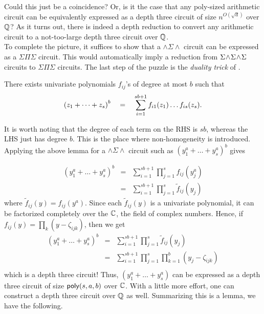 Could this just be a coincidence? Or, is it the case that any poly-sized arithmetic circuit can be equivalently expressed as a depth three circuit of size $n^{O(\sqrt{d})}$ over $\mathbb{Q}$? As it turns out, there is indeed a depth reduction to convert any arithmetic circuit to a not-too-large depth three circuit over $\mathbb{Q}$. \\

To complete the picture, it suffices to show that a $\wedge\Sigma\wedge$ circuit can be expressed as a $\Sigma\Pi\Sigma$ circuit. This would automatically imply a reduction from $\Sigma\!\wedge\!\Sigma\!\wedge\!\Sigma$ circuits to $\Sigma\Pi\Sigma$ circuits. The last step of the puzzle is the \emph{duality trick} of \cite{sax08}. 

\begin{lemma}\label{lem:duality} There exists univariate polynomials $f_{ij}$'s of degree at most $b$ such that
$$
\left(z_1 + \dots + z_s\right)^b \quad = \quad \sum_{i=1}^{sb+1} f_{i1}(z_1)\dots f_{is}(z_s).
$$
\end{lemma}

It is worth noting that the degree of each term on the RHS is $sb$, whereas the LHS just has degree $b$. This is the place where non-homogeneity is introduced. Applying the above lemma for a $\wedge\Sigma\wedge$ circuit such as $(y_1^a + \dots + y_s^a)^b$ gives

\begin{eqnarray*}
(y_1^a + \dots + y_s^a)^b & = & \sum_{i=1}^{sb+1} \prod_{j=1}^s f_{ij}(y_j^a)\\
 & = & \sum_{i=1}^{sb+1} \prod_{j=1}^s \tilde{f}_{ij}(y_j)
\end{eqnarray*}
where $\tilde{f}_{ij}(y) = f_{ij}(y^a)$. Since each $\tilde{f}_{ij}(y)$ is a univariate polynomial, it can be factorized completely over the $\mathbb{C}$, the field of complex numbers. Hence, if $f_{ij}(y) = \prod_k (y - \zeta_{ijk})$, then we get
\begin{eqnarray*}
(y_1^a + \dots + y_s^a)^b & = & \sum_{i=1}^{sb+1} \prod_{j=1}^s \tilde{f}_{ij}(y_j)\\
&= & \sum_{i=1}^{sb+1} \prod_{j=1}^s \prod_{k=1}^b (y_j - \zeta_{ijk})\\
\end{eqnarray*}
which is a depth three circuit! Thus, $(y_1^a + \dots + y_s^a)$ can be expressed as a depth three circuit of size $\mathsf{poly}(s,a,b)$ over $\mathbb{C}$. With a little more effort, one can construct a depth three circuit over $\mathbb{Q}$ as well. Summarizing this is a lemma, we have the following. 

